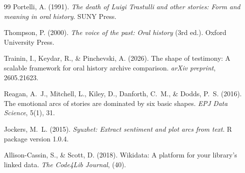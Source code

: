 \documentclass[review]{elsarticle}
\begin{document}
\begin{thebibliography}{99}
Portelli, A. (1991). \emph{The death of Luigi Trastulli and other stories: Form and meaning in oral history}. SUNY Press.

Thompson, P. (2000). \emph{The voice of the past: Oral history} (3rd ed.). Oxford University Press.

Trainin, I., Keydar, R., \& Pinchevski, A. (2026). The shape of testimony: A scalable framework for oral history archive comparison. \emph{arXiv preprint}, 2605.21623.

Reagan, A.~J., Mitchell, L., Kiley, D., Danforth, C.~M., \& Dodds, P.~S. (2016). The emotional arcs of stories are dominated by six basic shapes. \emph{EPJ Data Science}, 5(1), 31.

Jockers, M.~L. (2015). \emph{Syuzhet: Extract sentiment and plot arcs from text}. R package version 1.0.4.

Allison-Cassin, S., \& Scott, D. (2018). Wikidata: A platform for your library's linked data. \emph{The Code4Lib Journal}, (40).

\end{thebibliography}
\end{document}
